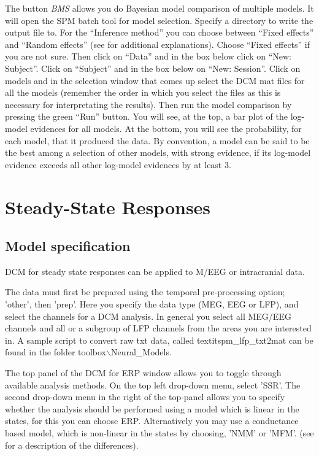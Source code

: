 The button \textit{BMS} allows you do Bayesian model comparison of
multiple models. It will open the SPM batch tool for model selection. Specify a directory to write the output file to.  For the ``Inference method'' you can choose between ``Fixed effects'' and ``Random effects'' (see \cite{klaas_bms} for additional explanations). Choose ``Fixed effects'' if you are not sure. Then click on ``Data'' and in the box below click on ``New: Subject''. Click on ``Subject'' and in the box below on ``New: Session''. Click on models and in the selection window that comes up select the DCM mat files for all the models (remember the order in which you select the files as this is necessary for interpretating the results). Then run the model comparison by pressing the green ``Run'' button. You will see, at the top, a bar plot of the log-model evidences for all models. At the bottom, you will see the probability, for each model, that it produced the data. By convention, a model can be said to be the best among a selection of other models, with strong evidence, if its log-model evidence exceeds all other log-model evidences by at least 3.

\section{Steady-State Responses}

\subsection{Model specification}
DCM for steady state responses can be applied to M/EEG or intracranial data.

The data must first be prepared using the temporal pre-processing option; 'other', then 'prep'. Here you specify the data type (MEG, EEG or LFP), and select the channels for a DCM analysis. In general you select all MEG/EEG channels and all or a subgroup of LFP channels from the areas you are interested in. A sample script to convert raw txt data, called textit{spm\_lfp\_txt2mat} can be found in the folder toolbox$\backslash$Neural\_Models.

The top panel of the DCM for ERP window allows you to toggle through available analysis methods. On the top left drop-down menu, select 'SSR'. The second drop-down menu in the right of the top-panel allows you to specify whether the analysis should be performed using a model which is linear in the states, for this you can choose ERP. Alternatively you may use a conductance based model, which is non-linear in the states by choosing, 'NMM' or 'MFM'. (see \cite{andre_sigmoid} for a description of the differences).


